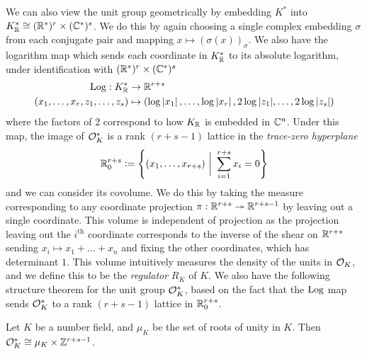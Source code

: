 \documentclass[11pt]{report}
\begin{document}


We can also view the unit group geometrically by embedding $K^*$ into $K_{\mathbb{R}}^* \cong (\mathbb{R}^*)^r \times (\mathbb{C}^*)^s$. We do this by again choosing a single complex embedding $\sigma$ from each conjugate pair and mapping $x \mapsto (\sigma(x))_{\sigma}$. We also have the logarithm map which sends each coordinate in $K_{\mathbb{R}}^*$ to its absolute logarithm, under identification with $(\mathbb{R}^*)^r \times (\mathbb{C}^*)^s$
\begin{align*}
    \operatorname{Log} : K_{\mathbb{R}}^* &\to \mathbb{R}^{r + s} \\
    (x_1, \ldots, x_r, z_1, \ldots, z_s) &\mapsto (\log\left| x_1 \right|, \ldots, \log\left| x_r \right|, 2\log{\left| z_1 \right|}, \ldots, 2\log{\left| z_s \right|})
\end{align*}
where the factors of 2 correspond to how $K_{\mathbb{R}}$ is embedded in $\mathbb{C}^n$. 
Under this map, the image of $\mathcal{O}_K^*$ is a rank $(r + s - 1)$ lattice in the \emph{trace-zero hyperplane}
$$
    \mathbb{R}_0^{r + s} \vcentcolon= \left\{  (x_1, \ldots, x_{r + s}) \ \bigg| \ \sum_{i = 1}^{r + s}x_i = 0  \right\}
$$
and we can consider its covolume. We do this by taking the measure corresponding to any coordinate projection $\pi : \mathbb{R}^{r + s} \twoheadrightarrow \mathbb{R}^{r + s - 1}$ by leaving out a single coordinate. This volume is independent of projection as the projection leaving out the $i^{\text{th}}$ coordinate corresponds to the inverse of the shear on $\mathbb{R}^{r + s}$ sending $x_i \mapsto x_1 + \ldots + x_n$ and fixing the other coordinates, which has determinant $1$. This volume intuitively measures the density of the units in $\mathcal{O}_K$, and we define this to be the \emph{regulator} $R_K$ of $K$. We also have the following structure theorem for the unit group $\mathcal{O}_K^*$, based on the fact that the $\operatorname{Log}$ map sends $\mathcal{O}_K^*$ to a rank $(r + s - 1)$ lattice in $\mathbb{R}_0^{r + s}$.
\begin{theorem}\label{dirunit}
    Let $K$ be a number field, and $\mu_K$ be the set of roots of unity in $K$. Then $\mathcal{O}_K^* \cong \mu_K \times \mathbb{Z}^{r + s - 1}$.
\end{theorem}
\end{document}
